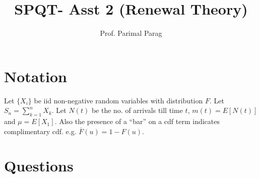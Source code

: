 \documentclass[a4paper,10pt]{article}
\title{SPQT- Asst 2 (Renewal Theory)}
\author{Prof. Parimal Parag}
\begin{document}
\maketitle
\section{Notation}
Let $\{X_i\}$ be iid non-negative random variables with distribution $F$. Let $S_n = \sum_{k=1}^n X_k$. Let $N(t)$ be the no. of arrivals till time $t$, $m(t) = E[N(t)]$ and $\mu = E[X_1]$. Also the presence of a ``bar'' on a cdf term indicates complimentary cdf. e.g. $\overline{F}(u) = 1 - F(u)$.

\section{Questions}
\end{document}
